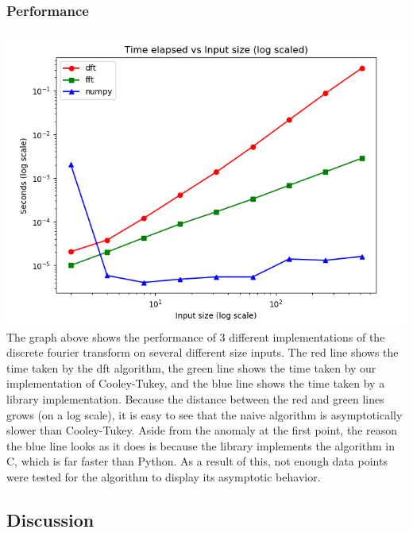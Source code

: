 	\subsubsection{Performance}
		\includegraphics[width=\linewidth]{images/perfGraph.png}
		The graph above shows the performance of 3 different implementations of the discrete fourier transform on several different size inputs. The red line shows the time taken by the dft algorithm, the green line shows the time taken by our implementation of Cooley-Tukey, and the blue line shows the time taken by a library implementation. Because the distance between the red and green lines grows (on a log scale), it is easy to see that the naive algorithm is asymptotically slower than Cooley-Tukey. Aside from the anomaly at the first point, the reason the blue line looks as it does is because the library implements the algorithm in C, which is far faster than Python. As a result of this, not enough data points were tested for the algorithm to display its asymptotic behavior.
\subsection{Discussion}

